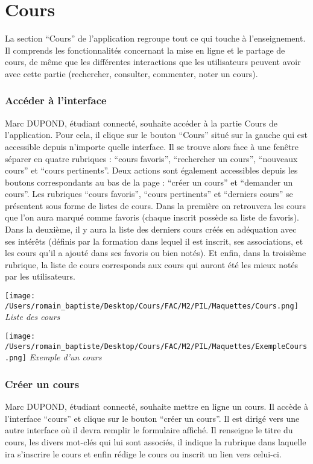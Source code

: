 \section*{Cours}
La section “Cours” de l’application regroupe tout ce qui touche à l’enseignement. Il comprends les fonctionnalités concernant la mise en ligne et le partage de cours, de même que les différentes interactions que les utilisateurs peuvent avoir avec cette partie (rechercher, consulter, commenter, noter un cours).
\subsubsection*{Accéder à l’interface}
Marc DUPOND, étudiant connecté, souhaite accéder à la partie Cours de l’application. Pour cela, il clique sur le bouton “Cours” situé sur la gauche qui est accessible depuis n’importe quelle interface. Il se trouve alors face à une fenêtre séparer en quatre rubriques : “cours favoris”, “rechercher un cours”, “nouveaux cours” et “cours pertinents”. Deux actions sont également accessibles depuis les boutons correspondants au bas de la page : “créer un cours” et “demander un cours”.
	Les rubriques “cours favoris”, “cours pertinents” et “derniers cours” se présentent sous forme de listes de cours. Dans la première on retrouvera les cours que l’on aura marqué comme favoris (chaque inscrit possède sa liste de favoris). Dans la deuxième, il y aura la liste des derniers cours créés en adéquation avec ses intérêts (définis par la formation dans lequel il est inscrit, ses associations, et les cours qu’il a ajouté dans ses favoris ou bien notés). Et enfin, dans la troisième rubrique, la liste de cours corresponds aux cours qui auront été les mieux notés par les utilisateurs.
\begin{center}
\texttt{[image: /Users/romain\_baptiste/Desktop/Cours/FAC/M2/PIL/Maquettes/Cours.png]}
\emph{Liste des cours}
\end{center}
\begin{center}
\texttt{[image: /Users/romain\_baptiste/Desktop/Cours/FAC/M2/PIL/Maquettes/ExempleCours.png]}
\emph{Exemple d'un cours}
\end{center}
\subsubsection*{Créer un cours}
Marc DUPOND, étudiant connecté, souhaite mettre en ligne un cours. Il accède à l’interface “cours” et clique sur le bouton “créer un cours”. Il est dirigé vers une autre interface où il devra remplir le formulaire affiché. Il renseigne le titre du cours, les divers mot-clés qui lui sont associés, il indique la rubrique dans laquelle ira s’inscrire le cours et enfin rédige le cours ou inscrit un lien vers celui-ci.
